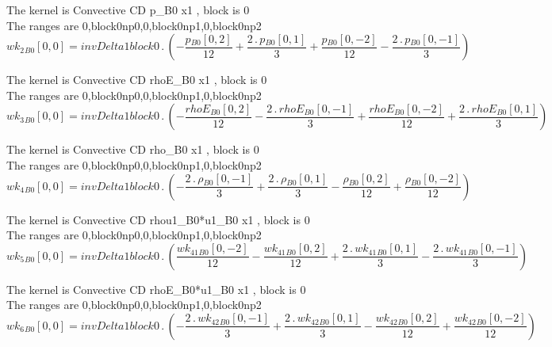 \documentclass{article}
\begin{document}
\noindent The kernel is Convective CD p_B0 x1 , block is 0\\\noindent The ranges are 0,block0np0,0,block0np1,0,block0np2\\\begin{dmath}{wk_{2}{_{B0}}}[{0,0}] = invDelta1block0 \,.\, \left(- \frac{{p{_{B0}}}[{0,2}]}{12} + \frac{2 \,.\, {p{_{B0}}}[{0,1}]}{3} + \frac{{p{_{B0}}}[{0,-2}]}{12} - \frac{2 \,.\, {p{_{B0}}}[{0,-1}]}{3}\right)\end{dmath}

\noindent The kernel is Convective CD rhoE_B0 x1 , block is 0\\\noindent The ranges are 0,block0np0,0,block0np1,0,block0np2\\\begin{dmath}{wk_{3}{_{B0}}}[{0,0}] = invDelta1block0 \,.\, \left(- \frac{{rhoE{_{B0}}}[{0,2}]}{12} - \frac{2 \,.\, {rhoE{_{B0}}}[{0,-1}]}{3} + \frac{{rhoE{_{B0}}}[{0,-2}]}{12} + \frac{2 \,.\, {rhoE{_{B0}}}[{0,1}]}{3}\right)\end{dmath}

\noindent The kernel is Convective CD rho_B0 x1 , block is 0\\\noindent The ranges are 0,block0np0,0,block0np1,0,block0np2\\\begin{dmath}{wk_{4}{_{B0}}}[{0,0}] = invDelta1block0 \,.\, \left(- \frac{2 \,.\, {\rho{_{B0}}}[{0,-1}]}{3} + \frac{2 \,.\, {\rho{_{B0}}}[{0,1}]}{3} - \frac{{\rho{_{B0}}}[{0,2}]}{12} + \frac{{\rho{_{B0}}}[{0,-2}]}{12}\right)\end{dmath}

\noindent The kernel is Convective CD rhou1_B0*u1_B0 x1 , block is 0\\\noindent The ranges are 0,block0np0,0,block0np1,0,block0np2\\\begin{dmath}{wk_{5}{_{B0}}}[{0,0}] = invDelta1block0 \,.\, \left(\frac{{wk_{41}{_{B0}}}[{0,-2}]}{12} - \frac{{wk_{41}{_{B0}}}[{0,2}]}{12} + \frac{2 \,.\, {wk_{41}{_{B0}}}[{0,1}]}{3} - \frac{2 \,.\, {wk_{41}{_{B0}}}[{0,-1}]}{3}\right)\end{dmath}

\noindent The kernel is Convective CD rhoE_B0*u1_B0 x1 , block is 0\\\noindent The ranges are 0,block0np0,0,block0np1,0,block0np2\\\begin{dmath}{wk_{6}{_{B0}}}[{0,0}] = invDelta1block0 \,.\, \left(- \frac{2 \,.\, {wk_{42}{_{B0}}}[{0,-1}]}{3} + \frac{2 \,.\, {wk_{42}{_{B0}}}[{0,1}]}{3} - \frac{{wk_{42}{_{B0}}}[{0,2}]}{12} + \frac{{wk_{42}{_{B0}}}[{0,-2}]}{12}\right)\end{dmath}
\end{document}

